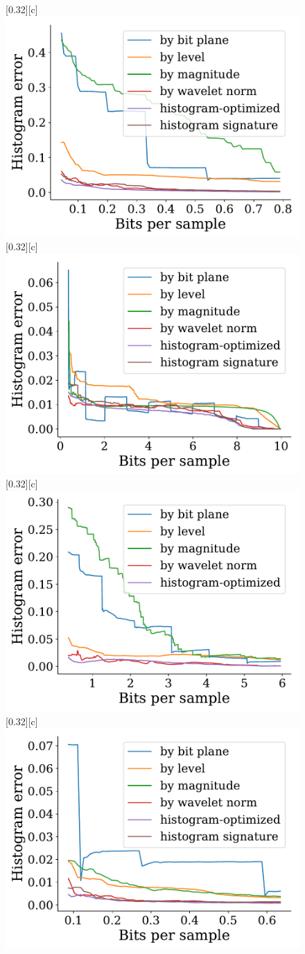 \documentclass{article}
\begin{document}
\begin{figure}[htb]
        \centering
        [0.32\linewidth][c]{%
               \includegraphics[width=0.3\linewidth]{img/supplementary/histogram-optimized-flame}}
        [0.32\linewidth][c]{%
               \includegraphics[width=0.3\linewidth]{img/supplementary/histogram-optimized-csafe}}
        [0.32\linewidth][c]{%
               \includegraphics[width=0.3\linewidth]{img/supplementary/histogram-optimized-enzo-v}}
        [0.32\linewidth][c]{%
               \includegraphics[width=0.3\linewidth]{img/supplementary/histogram-optimized-foam}}

\end{figure}
\end{document}

